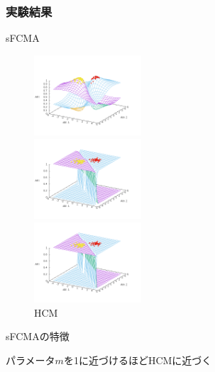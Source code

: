 \documentclass[13pt,dvipdfmx]{beamer}
\begin{document}
\begin{frame}\frametitle{実験結果}
  \begin{block}{sFCMA}
    \begin{figure}[htbp]
      \begin{minipage}{0.32\hsize}
        \begin{center}
          \includegraphics[width=40mm]{sFCMA-Em2.png}
        \end{center}
        \captionsetup{labelformat=empty,labelsep=none}
        \caption{$m=2$}
        \label{fig:one}
      \end{minipage}
      \begin{minipage}{0.32\hsize}
        \begin{center}
          \includegraphics[width=40mm]{sFCMA-Em11.png}
        \end{center}
        \captionsetup{labelformat=empty,labelsep=none}
        \caption{$m=1.01$}
        \label{fig:two}
      \end{minipage}
     \begin{minipage}{0.32\hsize}
        \begin{center}
          \includegraphics[width=40mm]{HCM.png}
        \end{center}
        \captionsetup{labelformat=empty,labelsep=none}
        \caption{HCM}
        \label{fig:three}
     \end{minipage}
    \end{figure}
  \end{block}
  \begin{block}{sFCMAの特徴}
    \begin{center}
      パラメータ$m$を1に近づけるほどHCMに近づく
    \end{center}
  \end{block}
\end{frame}
\end{document}
